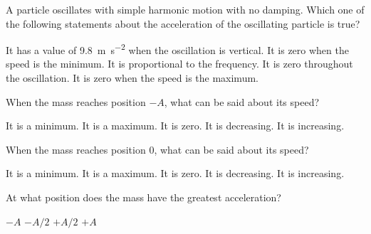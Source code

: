 \documentclass{../../../oss-ap12ibhl}
\begin{document}
\begin{questions}
  \question A particle oscillates with simple harmonic motion with no damping.
  Which one of the following statements about the acceleration of the
  oscillating particle is true?
  \begin{choices}
    \choice It has a value of \SI{9.8}{\metre\per\second\squared} when the
    oscillation is vertical.
    \choice It is zero when the speed is the minimum.
    \choice It is proportional to the frequency.
    \choice It is zero throughout the oscillation.
    \choice It is zero when the speed is the maximum.
  \end{choices}
  \newpage
  
  
  \question When the mass reaches position $-A$, what can be said about its
  speed?
  \label{one}
  \begin{choices}
    \choice It is a minimum.
    \choice It is a maximum.
    \choice It is zero.
    \choice It is decreasing.
    \choice It is increasing.
  \end{choices}
  
  \question When the mass reaches position 0, what can be said about its speed?
  \begin{choices}
    \choice It is a minimum.
    \choice It is a maximum.
    \choice It is zero.
    \choice It is decreasing.
    \choice It is increasing.
  \end{choices}
    
  \question At what position does the mass have the greatest acceleration?
  \begin{choices}
    \choice $-A$
    \choice $-A/2$
    \choice $+A/2$
    \choice $+A$
  \end{choices}
    

\end{questions}
\end{document}
